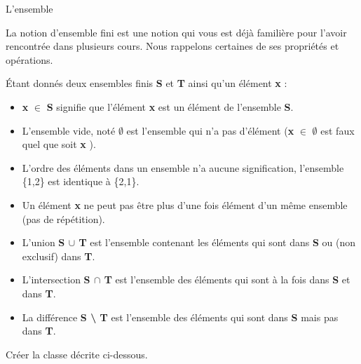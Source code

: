 \begin{Exercice}{L'ensemble}

	La notion d’ensemble fini est une notion qui vous est déjà 
	familière pour l’avoir rencontrée dans plusieurs cours. Nous rappelons
	certaines de ses propriétés et opérations. 
			
	Étant donnés deux ensembles
	finis \textbf{S} et \textbf{T} ainsi qu’un élément \textbf{x} :

	\begin{itemize}
	\item 
		\textbf{x} {${\in}$} \textbf{S} signifie que l’élément \textbf{x}
		est un élément de l’ensemble \textbf{S}.
	\item 
		L’ensemble vide, noté \textbf{${\emptyset}$} 
		est l’ensemble qui n’a pas d’élément 
		(\textbf{x} {${\in}$} \textbf{${\emptyset}$} 
		est faux quel que soit \textbf{x} ).
	\item 
		L’ordre des éléments dans un ensemble n’a
		aucune signification, l’ensemble \{1,2\} est
		identique à \{2,1\}.
	\item 
		Un élément \textbf{x} ne peut
		pas être plus d’une fois élément d’un même ensemble 
		(pas de répétition).
	\item 
		L’union \textbf{S ${\cup}$ T} 
		est l’ensemble contenant les éléments qui sont dans 
		\textbf{S} ou (non exclusif) dans \textbf{T}.
	\item 
		L’intersection \textbf{S ${\cap}$ T} 
		est l’ensemble des éléments qui sont à la fois 
		dans \textbf{S} et dans \textbf{T}.
	\item 
		La différence \textbf{S {\textbackslash} T} 
		est l’ensemble des éléments qui sont 
		dans \textbf{S} mais pas dans \textbf{T}.
	\end{itemize}
	
	Créer la classe 
	décrite ci-dessous.
	
	\begin{algo}
	\end{algo}
		

\end{Exercice}
